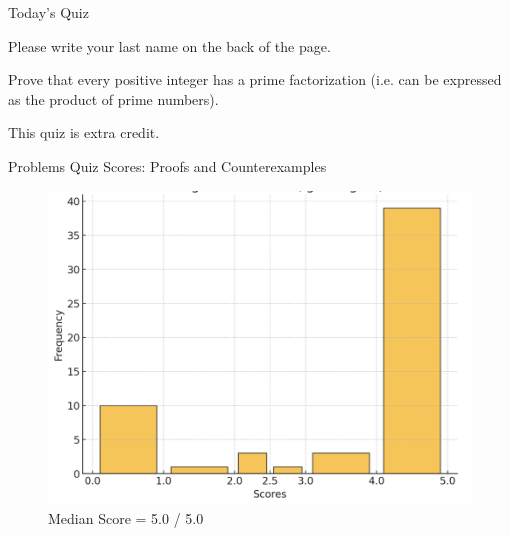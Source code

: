 \documentclass[10pt]{beamer}
\begin{document}
\begin{frame}{Today's Quiz}

\begin{myyellowbox}[title=Logistics Alert]
Please write your last name on the back of the page. 
\end{myyellowbox}

\vfill


 \begin{mygreenbox}[title=Reading Quiz (Induction)]
Prove that every positive integer has a prime factorization (i.e. can be expressed as the product of prime numbers).
\end{mygreenbox}

\vfill 

\begin{myredbox}[title=Bonus Alert]
This quiz is extra credit.
\end{myredbox}


\end{frame}



\begin{frame}{Problems Quiz Scores: Proofs and Counterexamples}

\begin{figure}[ht]
        \centering
        \includegraphics[width=.8\textwidth]{images/problems_quiz_scores}
        \caption{Median Score = 5.0 / 5.0}
\end{figure}
\vfill 

\end{frame}
\end{document}
